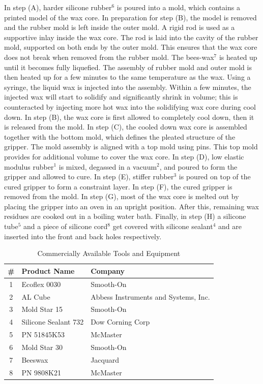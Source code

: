 In step (A), harder silicone rubber$^6$ is poured into a mold, which contains a printed model of the wax core.
In preparation for step (B), the model is removed and the rubber mold is left inside the outer mold.
A rigid rod is used as a supportive inlay inside the wax core.
The rod is laid into the cavity of the rubber mold, supported on both ends by the outer mold.
This ensures that the wax core does not break when removed from the rubber mold.
The bees-wax$^{7}$ is heated up until it becomes fully liquefied.
The assembly of rubber mold and outer mold is then heated up for a few minutes to the same temperature as the wax.
Using a syringe, the liquid wax is injected into the assembly.
Within a few minutes, the injected wax will start to solidify and significantly shrink in volume; this is counteracted by injecting more hot wax into the solidifying wax core during cool down.
In step (B), the wax core is first allowed to completely cool down, then it is released from the mold.
In step (C), the cooled down wax core is assembled together with the bottom mold, which defines the pleated structure of the gripper.
The mold assembly is aligned with a top mold using pins. This top mold provides for additional volume to cover the wax core.
In step (D), low elastic modulus rubber$^1$ is mixed, degassed in a vacuum$^2$, and poured to form the gripper and allowed to cure.
In step (E), stiffer rubber$^3$ is poured on top of the cured gripper to form a constraint layer.
In step (F), the cured gripper is removed from the mold.
In step (G), most of the wax core is melted out by placing the gripper into an oven in an upright position.
After this, remaining wax residues are cooked out in a boiling water bath.
Finally, in step (H) a silicone tube$^5$ and a piece of silicone cord$^{8}$ get covered with silicone sealant$^4$ and are inserted into the front and back holes respectively.

\begin{table}[h]
\caption{Commercially Available Tools and Equipment}
\centering
\begin{tabular}{c l l}
\hline
\hline
\# & Product Name & Company\\
\hline
1 & Ecoflex 0030&  Smooth-On\\
2 & AL Cube & Abbess Instruments and Systems, Inc.\\
3 & Mold Star 15 & Smooth-On\\
4 & Silicone Sealant 732 & Dow Corning Corp\\
5 & PN 51845K53 & McMaster\\
6 & Mold Star 30 & Smooth-On\\
7 & Beeswax & Jacquard\\
8 & PN 9808K21& McMaster\\
\hline
\end{tabular}
\label{tab:MachineTools}
\end{table}

